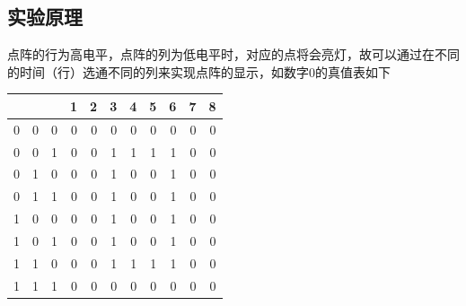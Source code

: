 \documentclass[11pt,UTF8]{ctexart}
\begin{document}
\subsection{实验原理}
点阵的行为高电平，点阵的列为低电平时，对应的点将会亮灯，故可以通过在不同的时间（行）选通不同的列来实现点阵的显示，如数字0的真值表如下
\begin{table}[H]
  \centering
    \begin{tabular}{|r|r|r|r|r|r|r|r|r|r|r|}
\cline{4-11}    \multicolumn{1}{r}{} & \multicolumn{1}{r}{} &       & 1     & 2     & 3     & 4     & 5     & 6     & 7     & 8 \bigstrut\\
    \hline
    0     & 0     & 0     & 0     & 0     & 0     & 0     & 0     & 0     & 0     & 0 \bigstrut\\
    \hline
    0     & 0     & 1     & 0     & 0     & \textcolor[rgb]{ 1,  0,  0}{1} & \textcolor[rgb]{ 1,  0,  0}{1} & \textcolor[rgb]{ 1,  0,  0}{1} & \textcolor[rgb]{ 1,  0,  0}{1} & 0     & 0 \bigstrut\\
    \hline
    0     & 1     & 0     & 0     & 0     & \textcolor[rgb]{ 1,  0,  0}{1} & 0     & 0     & \textcolor[rgb]{ 1,  0,  0}{1} & 0     & 0 \bigstrut\\
    \hline
    0     & 1     & 1     & 0     & 0     & \textcolor[rgb]{ 1,  0,  0}{1} & 0     & 0     & \textcolor[rgb]{ 1,  0,  0}{1} & 0     & 0 \bigstrut\\
    \hline
    1     & 0     & 0     & 0     & 0     & \textcolor[rgb]{ 1,  0,  0}{1} & 0     & 0     & \textcolor[rgb]{ 1,  0,  0}{1} & 0     & 0 \bigstrut\\
    \hline
    1     & 0     & 1     & 0     & 0     & \textcolor[rgb]{ 1,  0,  0}{1} & 0     & 0     & \textcolor[rgb]{ 1,  0,  0}{1} & 0     & 0 \bigstrut\\
    \hline
    1     & 1     & 0     & 0     & 0     & \textcolor[rgb]{ 1,  0,  0}{1} & \textcolor[rgb]{ 1,  0,  0}{1} & \textcolor[rgb]{ 1,  0,  0}{1} & \textcolor[rgb]{ 1,  0,  0}{1} & 0     & 0 \bigstrut\\
    \hline
    1     & 1     & 1     & 0     & 0     & 0     & 0     & 0     & 0     & 0     & 0 \bigstrut\\
    \hline
    \end{tabular}%
\end{table}%
\end{document}
